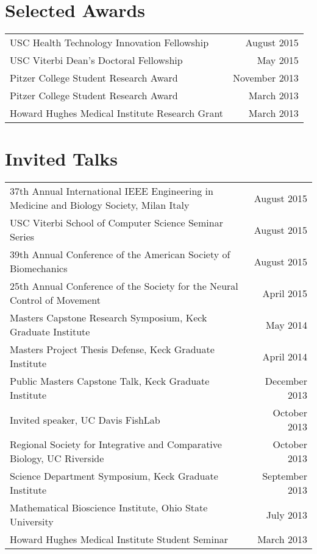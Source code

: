 \documentclass[10pt,a4paper]{article}
\begin{document}
  \vspace*{2mm}\section*{Selected Awards}
  
  \vspace*{1mm}\noindent\begin{tabularx}{17cm}{X r}
    USC Health Technology Innovation Fellowship & August 2015 \\ 
    USC Viterbi Dean's Doctoral Fellowship  & May 2015 \\
    Pitzer College Student Research Award & November 2013 \\
    Pitzer College Student Research Award & March 2013 \\
    Howard Hughes Medical Institute Research Grant & March 2013
  \end{tabularx}

  \vspace*{2mm}\section*{Invited Talks}

  \vspace*{1mm}\noindent\begin{tabularx}{17cm}{X r}
    37th Annual International IEEE Engineering in Medicine and Biology Society, Milan Italy & August 2015 \\
    USC Viterbi School of Computer Science Seminar Series & August 2015 \\
    39th Annual Conference of the American Society of Biomechanics & August 2015 \\
    25th Annual Conference of the Society for the Neural Control of Movement & April 2015 \\
    Masters Capstone Research Symposium, Keck Graduate Institute & May 2014 \\
    Masters Project Thesis Defense, Keck Graduate Institute & April 2014 \\
    Public Masters Capstone Talk, Keck Graduate Institute & December 2013 \\
    Invited speaker, UC Davis FishLab & October 2013 \\
    Regional Society for Integrative and Comparative Biology, UC Riverside & October 2013 \\
    Science Department Symposium, Keck Graduate Institute & September 2013 \\
    Mathematical Bioscience Institute, Ohio State University & July 2013\\
    Howard Hughes Medical Institute Student Seminar & March 2013
  \end{tabularx}
\end{document}
